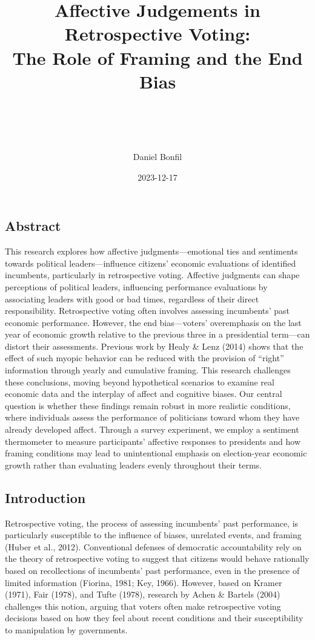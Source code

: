 \documentclass[
]{article}
\title{\hfill\break
\hfill\break
Affective Judgements in Retrospective Voting:\\
The Role of Framing and the End Bias\\
\strut \\}
\subtitle{\hfill\break
\hfill\break
FGV EBAPE\\
\strut \\
\strut \\
First Qualifying Examination\\
(Conceptual Paper)\\
\strut \\}
\author{Daniel Bonfil}
\date{2023-12-17}
\begin{document}
\maketitle

{
\setcounter{tocdepth}{2}
\tableofcontents
}
\newpage
\doublespacing

\hypertarget{abstract}{%
\subsection{Abstract}\label{abstract}}

This research explores how affective judgments---emotional ties and
sentiments towards political leaders---influence citizens' economic
evaluations of identified incumbents, particularly in retrospective
voting. Affective judgments can shape perceptions of political leaders,
influencing performance evaluations by associating leaders with good or
bad times, regardless of their direct responsibility. Retrospective
voting often involves assessing incumbents' past economic performance.
However, the end bias---voters' overemphasis on the last year of
economic growth relative to the previous three in a presidential
term---can distort their assessments. Previous work by Healy \& Lenz
(2014) shows that the effect of such myopic behavior can be reduced with
the provision of ``right'' information through yearly and cumulative
framing. This research challenges these conclusions, moving beyond
hypothetical scenarios to examine real economic data and the interplay
of affect and cognitive biases. Our central question is whether these
findings remain robust in more realistic conditions, where individuals
assess the performance of politicians toward whom they have already
developed affect. Through a survey experiment, we employ a sentiment
thermometer to measure participants' affective responses to presidents
and how framing conditions may lead to unintentional emphasis on
election-year economic growth rather than evaluating leaders evenly
throughout their terms.

\hypertarget{introduction}{%
\subsection{Introduction}\label{introduction}}

Retrospective voting, the process of assessing incumbents' past
performance, is particularly susceptible to the influence of biases,
unrelated events, and framing (Huber et al., 2012). Conventional
defenses of democratic accountability rely on the theory of
retrospective voting to suggest that citizens would behave rationally
based on recollections of incumbents' past performance, even in the
presence of limited information (Fiorina, 1981; Key, 1966). However,
based on Kramer (1971), Fair (1978), and Tufte (1978), research by Achen
\& Bartels (2004) challenges this notion, arguing that voters often make
retrospective voting decisions based on how they feel about recent
conditions and their susceptibility to manipulation by governments.
\end{document}
